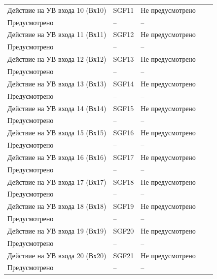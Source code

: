 \begin{longtable}{|>{\centering\arraybackslash}m{5.3cm}|>{\centering\arraybackslash}m{3.3cm}|>{\centering\arraybackslash}m{4.2cm}|>{\centering\arraybackslash}m{1.8cm}|>{\centering\arraybackslash}m{1cm}|}
\hline
\centering Действие на УВ входа 10 (Вх10)  & \centering SGF11 & \centering Не предусмотрено \\ Предусмотрено & \centering -- & \centering \arraybackslash -- \\
\hline
\centering Действие на УВ входа 11 (Вх11)  & \centering SGF12 & \centering Не предусмотрено \\ Предусмотрено & \centering -- & \centering \arraybackslash -- \\
\hline
\centering Действие на УВ входа 12 (Вх12)  & \centering SGF13 & \centering Не предусмотрено \\ Предусмотрено & \centering -- & \centering \arraybackslash -- \\
\hline
\centering Действие на УВ входа 13 (Вх13)  & \centering SGF14 & \centering Не предусмотрено \\ Предусмотрено & \centering -- & \centering \arraybackslash -- \\
\hline
\centering Действие на УВ входа 14 (Вх14)  & \centering SGF15 & \centering Не предусмотрено \\ Предусмотрено & \centering -- & \centering \arraybackslash -- \\
\hline
\centering Действие на УВ входа 15 (Вх15)  & \centering SGF16 & \centering Не предусмотрено \\ Предусмотрено & \centering -- & \centering \arraybackslash -- \\
\hline
\centering Действие на УВ входа 16 (Вх16)  & \centering SGF17 & \centering Не предусмотрено \\ Предусмотрено & \centering -- & \centering \arraybackslash -- \\
\hline
\centering Действие на УВ входа 17 (Вх17)  & \centering SGF18 & \centering Не предусмотрено \\ Предусмотрено & \centering -- & \centering \arraybackslash -- \\
\hline
\centering Действие на УВ входа 18 (Вх18)  & \centering SGF19 & \centering Не предусмотрено \\ Предусмотрено & \centering -- & \centering \arraybackslash -- \\
\hline
\centering Действие на УВ входа 19 (Вх19)  & \centering SGF20 & \centering Не предусмотрено \\ Предусмотрено & \centering -- & \centering \arraybackslash -- \\
\hline
\centering Действие на УВ входа 20 (Вх20)  & \centering SGF21 & \centering Не предусмотрено \\ Предусмотрено & \centering -- & \centering \arraybackslash -- \\

\end{longtable}
